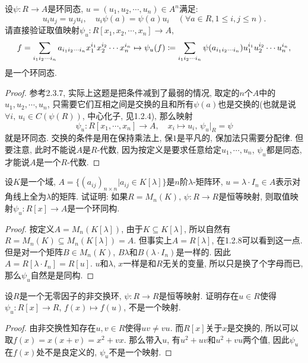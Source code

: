 \documentclass{../solutions-cn}
\begin{document}
\begin{exercise}[习题2.4.5]
    设$\psi:R \to A$是环同态, $u = (u_1, u_2, \cdots, u_n) \in A^n$满足:
\[
    u_iu_j = u_ju_i,\quad u_i\psi(a) = \psi(a)u_i \quad (\forall a \in R, 1 \leqslant i, j \leqslant n).
\]
请直接验证取值映射$\psi_u:R[x_1, x_2, \cdots, x_n] \to A$,
\[
    f = \sum_{i_1i_2\cdots i_n} a_{i_1i_2\cdots i_n}x_1^{i_1}x_2^{i_2}\cdots x_n^{i_n}
    \mapsto \psi_u(f) \mathrel{\coloneqq} \sum_{i_1i_2\cdots i_n} \psi(a_{i_1i_2\cdots i_n})u_1^{i_1}u_2^{i_2}\cdots u_n^{i_n},
\]
是一个环同态.
\end{exercise}

\begin{proof}
    参考2.3.7, 实际上这题是把条件减到了最弱的情况, 取定的$n$个$A$中的$u_1, u_2, \cdots, u_n$, 只需要它们互相之间是交换的且和所有$\psi(a)$也是交换的(也就是说$\forall i,\, u_i \in C(\psi(R))$, 中心化子, 见1.2.4), 那么映射
    \[
        \psi_u:R[x_1, \cdots, x_n] \to A,\quad x_i \mapsto u_i,\,  \psi_u|_R = \psi
    \]
    就是环同态. 交换的条件是用在保持乘法上, 保$1$是平凡的, 保加法只需要分配律. 但要注意, 此时不能说$A$是$R$-代数, 因为按定义是要求任意给定$u_1, \cdots, u_n$, $\psi_u$都是同态, 才能说$A$是一个$R$-代数.
\end{proof}

\begin{exercise}[习题2.4.6]
    设$K$是一个域, $A = \{(a_{ij})_{n \times n}|a_{ij} \in K[\lambda]\}$是$n$阶$\lambda$-矩阵环, $u = \lambda \cdot I_n \in A$表示对角线上全为$\lambda$的矩阵. 试证明: 如果$R = M_n(K),\, \psi:R \to R$是恒等映射, 则取值映射$\psi_u:R[x] \to A$是一个环同构.
\end{exercise}

\begin{proof}
    按定义$A = M_n(K[\lambda])$, 由于$K \subseteq K[\lambda]$, 所以自然有$R = M_n(K) \subseteq M_n(K[\lambda]) = A$. 但事实上$A = R[\lambda]$, 在1.2.8可以看到这一点. 但是对一个矩阵$B \in M_n(K)$, $B\lambda$和$B(\lambda \cdot I_n)$是一样的. 因此$A = R[\lambda \cdot I_n] = R[u]$. $u$和$\lambda$, $x$一样是和$R$无关的变量, 所以只是换了个字母而已, 那么$\psi_u$自然是是同构.
\end{proof}

\begin{exercise}[习题2.4.7]
    设$R$是一个无零因子的非交换环, $\psi:R \to R$是恒等映射. 证明存在$u \in R$使得$\psi_u:R[x] \to R$, $f(x) \mapsto f(u)$, 不是一个映射.
\end{exercise}
    
\begin{proof}
    由非交换性知存在$u, v \in R$使得$uv \neq vu$. 而$R[x]$关于$x$是交换的, 所以可以取$f(x) = x(x + v) = x^2 + vx$. 那么带入$u$, 有$u^2 + uv$和$u^2 + vu$两个值, 因此$\psi_u$在$f(x)$处不是良定义的, $\psi_u$不是一个映射.
\end{proof}
\end{document}
